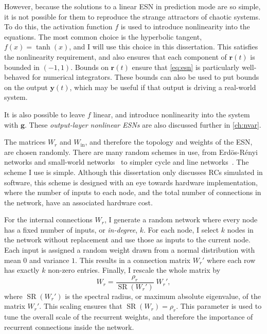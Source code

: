 However, because the solutions to a linear ESN in prediction mode are
so simple, it is not possible for them to reproduce the strange
attractors of chaotic systems. To do this, the activation function $f$
is used to introduce nonlinearity into the equations. The most common
choice is the hyperbolic tangent, $f(x) = \tanh(x)$, and I will use this choice
in this dissertation. This satisfies the nonlinearity requirement, and
also ensures that each component of $\bm{r}(t)$ is bounded in $(-1,
1)$. Bounds on $\bm{r}(t)$ ensure that \cref{eq:esn} is particularly
well-behaved for numerical integrators. These bounds can also be used
to put bounds on the output $\bm{y}(t)$, which may be useful if that
output is driving a real-world system.

It is also possible to leave $f$ linear, and introduce nonlinearity
into the system with $\bm{g}$. These \emph{output-layer nonlinear ESNs} are
also discussed further in \cref{ch:nvar}.

The matrices $W_r$ and $W_\text{in}$, and therefore the topology and
weights of the ESN, are chosen randomly. There are many random schemes
in use, from Erd{\"{o}}s-R{\'{e}}nyi networks and small-world
networks~\cite{haluszczynski2019} to simpler cycle and line
networks~\cite{rodan2011}. The scheme I use is simple. Although this
dissertation only discusses RCs simulated in software, this scheme is
designed with an eye towards hardware implementation, where the number
of inputs to each node, and the total number of connections in the
network, have an associated hardware cost.

For the internal connections $W_r$, I generate a random network where
every node has a fixed number of inputs, or \emph{in-degree}, $k$. For
each node, I select $k$ nodes in the network without replacement and
use those as inputs to the current node. Each input is assigned a
random weight drawn from a normal distribution with mean $0$ and
variance $1$. This results in a connection matrix $W_r'$ where each
row has exactly $k$ non-zero entries. Finally, I rescale the whole
matrix by
\begin{equation}
  \label{eq:setradius}
  W_r = \frac{\rho_r}{\operatorname{SR}(W_r')}\;W_r',
\end{equation}
where $\operatorname{SR}(W_r')$ is the spectral radius, or maximum
absolute eigenvalue, of the matrix $W_r'$. This scaling ensures that
$\operatorname{SR}(W_r) = \rho_r$. This parameter is used to tune the
overall scale of the recurrent weights, and therefore the importance
of recurrent connections inside the network.

